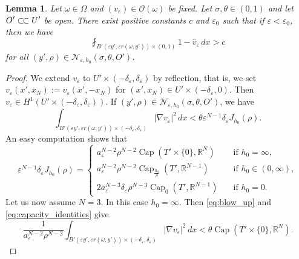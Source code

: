 \documentclass{article}
\numberwithin{equation}{section}
\newtheorem{lemma}[theorem]{Lemma}
\theoremstyle{definition}
\theoremstyle{remark}
\newcommand{\cpct}{\operatorname{Cap}}
\newcommand{\csubset}{\subset\joinrel\subset}
\begin{document}
\begin{lemma} \label{lm:bad_point_big_average}
    Let $\omega \in \Omega$ and $(v_\varepsilon) \in \mathcal{O}(\omega)$ be fixed. Let $\sigma, \theta \in (0, 1)$ and let $O' \csubset U'$ be open. There exist positive constants $c$ and $\varepsilon_0$ such that if $\varepsilon < \varepsilon_0$, then we have
    \begin{equation} \label{eq:bad_point_big_average}
        \fint_{B'(\varepsilon y', \varepsilon r(\omega, y')) \times (0, 1)} 1 - \hat{v}_\varepsilon \, dx > c
    \end{equation}
    for all $(y', \rho) \in \mathcal{N}_{\varepsilon, h_0}(\sigma, \theta, O')$.
\end{lemma}

\begin{proof}
    We extend $v_\varepsilon$ to $U' \times (-\delta_\varepsilon, \delta_\varepsilon)$ by reflection, that is, we set $v_\varepsilon(x', x_N) := v_\varepsilon(x', -x_N)$ for $(x', x_N) \in U' \times (-\delta_\varepsilon, 0)$. Then $v_\varepsilon \in H^1(U' \times (-\delta_\varepsilon, \delta_\varepsilon))$. If $(y', \rho) \in \mathcal{N}_{\varepsilon, h_0}(\sigma, \theta, O')$, we have
    \begin{equation} \label{eq:blow_up}
        \int_{B'(\varepsilon y', \varepsilon r(\omega, y')) \times (-\delta_\varepsilon, \delta_\varepsilon)} |\nabla v_\varepsilon|^2  \, dx < \theta \varepsilon^{N - 1} \delta_\varepsilon J_{h_0}(\rho).
    \end{equation}
    An easy computation shows that
    \begin{equation} \label{eq:capacity_identities}
    \varepsilon^{N - 1} \delta_\varepsilon J_{h_0}(\rho) = 
        \begin{cases}
            a_\varepsilon^{N - 2} \rho^{N - 2} \cpct(T' \times \{0\}, \mathbb{R}^N) \quad &\text{if } h_0 = \infty, \\
            a_\varepsilon^{N - 2} \rho^{N - 2} \cpct_{\frac{h_0}{\rho}}(T', \mathbb{R}^{N - 1}) \quad &\text{if } h_0 \in (0, \infty), \\
            2 a_\varepsilon^{N - 3} \delta_\varepsilon \rho^{N - 3} \cpct_0(T', \mathbb{R}^{N - 1}) \quad &\text{if } h_0 = 0.
        \end{cases}
    \end{equation}
    Let us now assume $N = 3$. In this case $h_0 = \infty$. Then \eqref{eq:blow_up} and \eqref{eq:capacity_identities} give
    \[
    \frac{1}{a_\varepsilon^{N - 2} \rho^{N - 2}} \int_{B'(\varepsilon y', \varepsilon r(\omega, y')) \times (-\delta_\varepsilon, \delta_\varepsilon)} |\nabla v_\varepsilon|^2 \, dx < \theta \cpct(T' \times \{0\}, \mathbb{R}^N).
\]
\end{proof}
\end{document}
